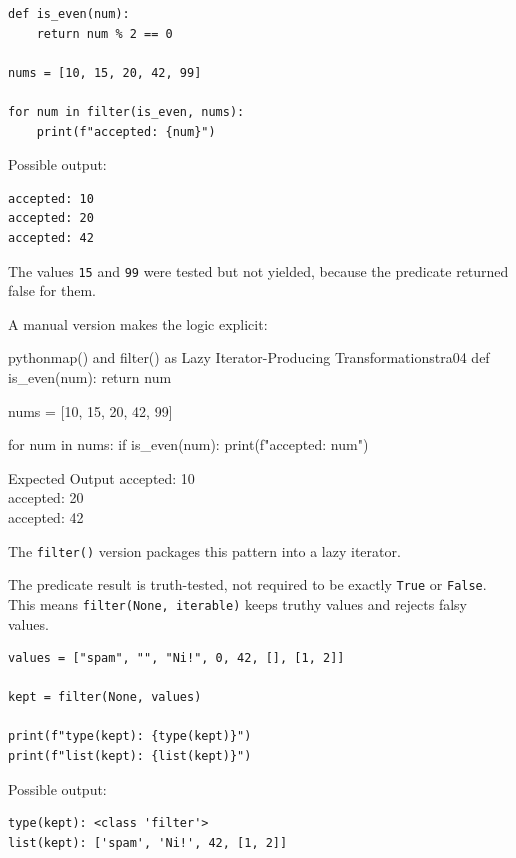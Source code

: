 \documentclass[a4paper,twoside]{report}
\begin{document}
\begin{verbatim}
def is_even(num):
    return num % 2 == 0

nums = [10, 15, 20, 42, 99]

for num in filter(is_even, nums):
    print(f"accepted: {num}")
\end{verbatim}

Possible output:

\begin{verbatim}
accepted: 10
accepted: 20
accepted: 42
\end{verbatim}

The values \texttt{15} and \texttt{99} were tested but not yielded, because the predicate returned false for them.

A manual version makes the logic explicit:

\begin{codebox}[]{python}{map() and filter() as Lazy Iterator-Producing Transformations}{tra04}
def is_even(num):
    return num %

nums = [10, 15, 20, 42, 99]

for num in nums:
    if is_even(num):
        print(f"accepted: {num}")
\end{codebox}


\begin{iobox}{Expected Output}
accepted: 10 \\
accepted: 20 \\
accepted: 42 \\
\end{iobox}




The \texttt{filter()} version packages this pattern into a lazy iterator.

The predicate result is truth-tested, not required to be exactly \texttt{True} or \texttt{False}. This means \texttt{filter(None, iterable)} keeps truthy values and rejects falsy values.

\begin{verbatim}
values = ["spam", "", "Ni!", 0, 42, [], [1, 2]]

kept = filter(None, values)

print(f"type(kept): {type(kept)}")
print(f"list(kept): {list(kept)}")
\end{verbatim}

Possible output:

\begin{verbatim}
type(kept): <class 'filter'>
list(kept): ['spam', 'Ni!', 42, [1, 2]]
\end{verbatim}
\end{document}

